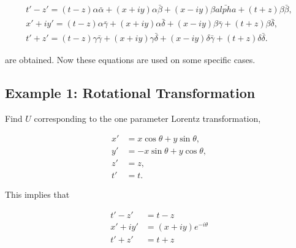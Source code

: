 
\begin{subequations}
\begin{gather}\label{general_coeff_equate_a}
t' - z'  = (t-z)\alpha\bar{\alpha} + (x + iy)\alpha\bar{\beta} + (x - iy)\beta\bar{alpha} + (t+z)\beta\bar{\beta},
\\\label{general_coeff_equate_b}
x' + iy'  = (t-z)\alpha\bar{\gamma} + (x + iy)\alpha\bar{\delta} + (x-iy)\beta\bar{\gamma} + (t+z)\beta\bar{\delta},
\\\label{general_coeff_equate_c}
t' + z'  = (t-z)\gamma\bar{\gamma} + (x + iy)\gamma\bar{\delta} + (x-iy)\delta\bar{\gamma} + (t+z)\delta\bar{\delta}.
\end{gather}
\end{subequations}

\noindent are obtained. Now these equations are used on some specific cases.

\subsection{Example 1: Rotational Transformation}

\noindent Find $U$ corresponding to the one parameter Lorentz transformation,

\begin{align*} 
x' & = x\cos{\theta} + y\sin{\theta}, \\
y' & = -x\sin{\theta} + y\cos{\theta}, \\
z' & = z, \\
t' & = t.
\end{align*} 

\noindent This implies that

\begin{align*}
t'-z' & = t-z \\
x'+iy' & = (x+iy) e^{-i \theta} \\
t'+z' & = t+z
\end{align*}

